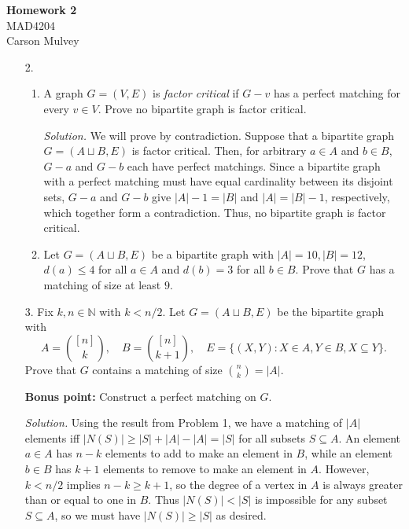 \documentclass[11pt,letterpaper]{article}
\newenvironment{solution}{\color{teal}\textit{Solution.}}{\color{black}}
\begin{document}

\flushleft

\begin{center}
    \begin{large}
        \textbf{Homework 2} \\
        MAD4204 \\
        Carson Mulvey
    \end{large}
\end{center}

\pagestyle{empty}


\flushleft

\begin{enumerate}

\item[2.]
\begin{enumerate}
\item A graph $G = (V,E)$ is \emph{factor critical} if $G - v$ has a perfect matching for every $v \in V$.
Prove no bipartite graph is factor critical.

\begin{solution}
    We will prove by contradiction. Suppose that a bipartite graph $G = (A \sqcup B, E)$ is factor critical. Then, for arbitrary $a\in{A}$ and $b\in{B}$, $G-a$ and $G-b$ each have perfect matchings. Since a bipartite graph with a perfect matching must have equal cardinality between its disjoint sets, $G-a$ and $G-b$ give $|A|-1=|B|$ and $|A|=|B|-1$, respectively, which together form a contradiction. Thus, no bipartite graph is factor critical. \qedsymbol
\end{solution}

\item Let $G = (A \sqcup B, E)$ be a bipartite graph with $|A|= 10, |B| = 12$, $d(a) \leq 4$ for all $a \in A$ and $d(b) = 3$ for all $b \in B$.
Prove that $G$ has a matching of size at least $9$.

\end{enumerate}

\item[3.] Fix $k,n \in \mathbb{N}$ with $k < n/2$.
Let $G = (A \sqcup B, E)$ be the bipartite graph with
\[
A = \binom{[n]}{k}, \quad B = \binom{[n]}{k+1}, \quad E = \{(X,Y): X \in A, Y \in B, X \subseteq Y\}.
\]
Prove that $G$ contains a matching of size $\binom{n}{k} = |A|$.

\textbf{Bonus point:} Construct a perfect matching on $G$.

\begin{solution}
    Using the result from Problem 1, we have a matching of $|A|$ elements iff $|N(S)|\geq{}|S|+|A|-|A|=|S|$ for all subsets $S\subseteq{A}$. An element $a\in{A}$ has $n-k$ elements to add to make an element in $B$, while an element $b\in{B}$ has $k+1$ elements to remove to make an element in $A$. However, $k<n/2$ implies $n-k\geq{}k+1$, so the degree of a vertex in $A$ is always greater than or equal to one in $B$. Thus $|N(S)|<|S|$ is impossible for any subset $S\subseteq{A}$, so we must have $|N(S)|\geq{}|S|$ as desired.
\end{solution}

\end{enumerate}
\end{document}
